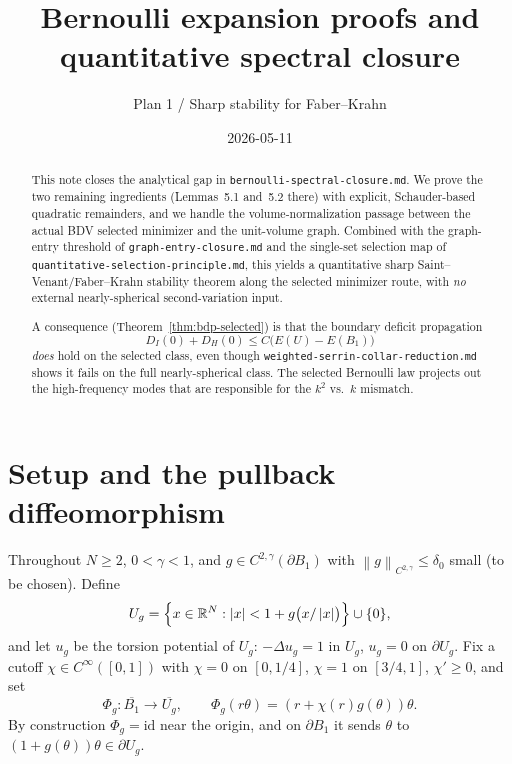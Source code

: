 \documentclass[11pt]{article}
\title{Bernoulli expansion proofs and quantitative spectral closure}
\author{Plan 1 / Sharp stability for Faber--Krahn}
\date{2026-05-11}
\theoremstyle{definition}
\newcommand{\R}{\mathbb{R}}
\newcommand{\norm}[1]{\left\|#1\right\|}
\newcommand{\abs}[1]{\left|#1\right|}
\begin{document}
\maketitle

\begin{abstract}
This note closes the analytical gap in \texttt{bernoulli-spectral-closure.md}.
We prove the two remaining ingredients (Lemmas~5.1 and~5.2 there) with
explicit, Schauder-based quadratic remainders, and we handle the
volume-normalization passage between the actual BDV selected minimizer and the
unit-volume graph. Combined with the graph-entry threshold of
\texttt{graph-entry-closure.md} and the single-set selection map of
\texttt{quantitative-selection-principle.md}, this yields a quantitative
sharp Saint--Venant/Faber--Krahn stability theorem along the selected
minimizer route, with \emph{no} external nearly-spherical second-variation
input.

A consequence (Theorem~\ref{thm:bdp-selected}) is that the boundary deficit
propagation
\[
D_I(0)+D_H(0)\le C\bigl(E(U)-E(B_1)\bigr)
\]
\emph{does} hold on the selected class, even though
\texttt{weighted-serrin-collar-reduction.md} shows it fails on the full
nearly-spherical class. The selected Bernoulli law projects out the
high-frequency modes that are responsible for the $k^2$ vs.\ $k$ mismatch.
\end{abstract}

\section{Setup and the pullback diffeomorphism}\label{sec:setup}

Throughout $N\ge2$, $0<\gamma<1$, and $g\in C^{2,\gamma}(\partial B_1)$ with
$\norm{g}_{C^{2,\gamma}}\le\delta_0$ small (to be chosen). Define
\[
U_g
=
\Bigl\{x\in\R^N:\abs{x}<1+g\bigl(x/\abs{x}\bigr)\Bigr\}\cup\{0\},
\]
and let $u_g$ be the torsion potential of $U_g$: $-\Delta u_g=1$ in $U_g$,
$u_g=0$ on $\partial U_g$. Fix a cutoff $\chi\in C^\infty([0,1])$ with
$\chi=0$ on $[0,1/4]$, $\chi=1$ on $[3/4,1]$, $\chi'\ge0$, and set
\[
\Phi_g:\overline{B_1}\to\overline{U_g},\qquad
\Phi_g(r\theta)=(r+\chi(r)g(\theta))\theta.
\]
By construction $\Phi_g=\mathrm{id}$ near the origin, and on
$\partial B_1$ it sends $\theta$ to $(1+g(\theta))\theta\in\partial U_g$.
\end{document}
